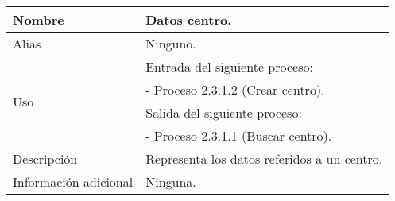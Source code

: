 \begin{center}
  \begin{tabular}{| l | p{9cm} |}
    \hline
    Nombre & \textbf{Datos centro}.\\
    \hline
    Alias & Ninguno.\\
    \hline
    \multirow{4}{*}{Uso} & Entrada del siguiente proceso:\\
                         & - Proceso 2.3.1.2 (Crear centro).\\
                         & Salida del siguiente proceso:\\
                         & - Proceso 2.3.1.1 (Buscar centro).\\
    \hline
    Descripción & Representa los datos referidos a un centro.\\
    \hline
    Información adicional & Ninguna.\\
    \hline
  \end{tabular}
\end{center}
